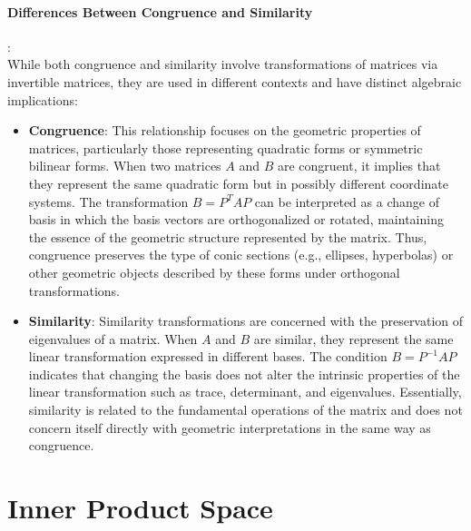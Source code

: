 \documentclass[11pt]{book} %
\begin{document}
\paragraph{Differences Between Congruence and Similarity}: \\

While both congruence and similarity involve transformations of matrices via invertible matrices, they are used in different contexts and have distinct algebraic implications:

\begin{itemize}
    \item \textbf{Congruence}: This relationship focuses on the geometric properties of matrices, 
    particularly those representing quadratic forms or symmetric bilinear forms. When two matrices \( A \) and \( B \) are congruent, 
    it implies that they represent the same quadratic form but in possibly different coordinate systems. 
    The transformation \( B = P^T A P \) can be interpreted as a change of basis in which the basis vectors are orthogonalized or rotated, 
    maintaining the essence of the geometric structure represented by the matrix. 
    Thus, congruence preserves the type of conic sections (e.g., ellipses, hyperbolas) or other geometric objects described by these forms under orthogonal transformations.

    \item \textbf{Similarity}: Similarity transformations are concerned with the preservation of eigenvalues of a matrix. 
    When \( A \) and \( B \) are similar, they represent the same linear transformation expressed in different bases. 
    The condition \( B = P^{-1} A P \) indicates that changing the basis does not alter the intrinsic properties of the linear transformation such as 
    trace, determinant, and eigenvalues. Essentially, similarity is related to the fundamental operations of the matrix and does not 
    concern itself directly with geometric interpretations in the same way as congruence. 

\end{itemize}


\section{Inner Product Space}
\end{document}
